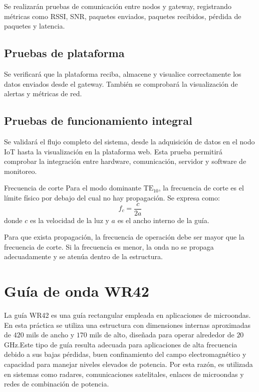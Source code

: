 Se realizarán pruebas de comunicación entre nodos y gateway, registrando métricas como RSSI, SNR, paquetes enviados, paquetes recibidos, pérdida de paquetes y latencia.

\subsection{Pruebas de plataforma}

Se verificará que la plataforma reciba, almacene y visualice correctamente los datos enviados desde el gateway. También se comprobará la visualización de alertas y métricas de red.

\subsection{Pruebas de funcionamiento integral}

Se validará el flujo completo del sistema, desde la adquisición de datos en el nodo IoT hasta la visualización en la plataforma web. Esta prueba permitirá comprobar la integración entre hardware, comunicación, servidor y software de monitoreo.

\begin{conceptcard}{Frecuencia de corte}
Para el modo dominante $\text{TE}_{10}$, la frecuencia de corte es el límite físico por debajo del cual no hay propagación. Se expresa como:
\begin{equation}
f_c = \frac{c}{2a}
\end{equation}
donde $c$ es la velocidad de la luz y $a$ es el ancho interno de la guía.
\end{conceptcard}

Para que exista propagación, la frecuencia de operación debe ser mayor que la frecuencia de corte. Si la frecuencia es menor, la onda no se propaga adecuadamente y se atenúa dentro de la estructura.

\section{Guía de onda WR42}

La guía WR42 es una guía rectangular empleada en aplicaciones de microondas. En esta práctica se utiliza una estructura con dimensiones internas aproximadas de $420$ mils de ancho y $170$ mils de alto, diseñada para operar alrededor de $20$ GHz.Este tipo de guía resulta adecuada para aplicaciones de alta frecuencia debido a sus bajas pérdidas, buen confinamiento del campo electromagnético y capacidad para manejar niveles elevados de potencia. Por esta razón, es utilizada en sistemas como radares, comunicaciones satelitales, enlaces de microondas y redes de combinación de potencia.

